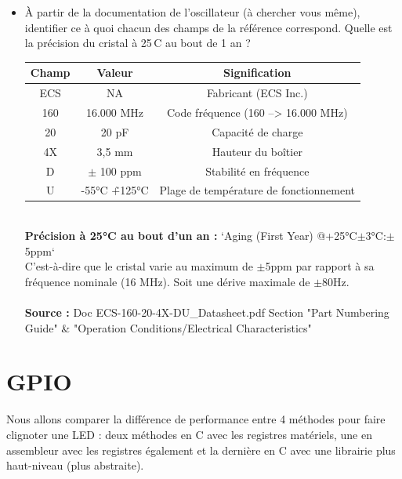 \documentclass[a4paper,11pt]{article}
\begin{document}
\begin{itemize}
    \item À partir de la documentation de l'oscillateur (à chercher vous même), identifier ce à quoi chacun des champs de la référence correspond. Quelle est la précision du cristal à 25\,\textdegree{}C au bout de 1 an ?
    \begin{solution}
        \begin{tabular}{|c|c|c|}
            \hline
            Champ & Valeur & Signification \\
            \hline
            \hline
            ECS & NA & Fabricant (ECS Inc.)\\
            \hline
            160 & 16.000 MHz & Code fréquence (160 --> 16.000 MHz)\\
            \hline
            20 & 20 pF & Capacité de charge \\
            \hline
            4X & 3,5 mm & Hauteur du boîtier \\
            \hline
            D & $\pm$ 100 ppm & Stabilité en fréquence \\
            \hline
            U & -55°C \~ +125°C & Plage de température de fonctionnement \\
            \hline
        \end{tabular}\\
        \textbf{Précision à 25°C au bout d'un an :} `Aging (First Year) @+25°C$\pm$3°C:$\pm$5ppm`\\
        C'est-à-dire que le cristal varie au maximum de $\pm$5ppm par rapport à sa fréquence nominale (16 MHz). Soit une dérive maximale de $\pm$80Hz.\\\\
        \textbf{Source :} Doc ECS-160-20-4X-DU\_Datasheet.pdf Section "Part Numbering Guide" & "Operation Conditions/Electrical Characteristics"
    \end{solution}
\end{itemize}

\section{GPIO}

Nous allons comparer la différence de performance entre 4 méthodes pour faire clignoter une LED : deux méthodes en C avec les registres matériels, une en assembleur avec les registres également et la dernière en C avec une librairie plus haut-niveau (plus abstraite).
\end{document}
